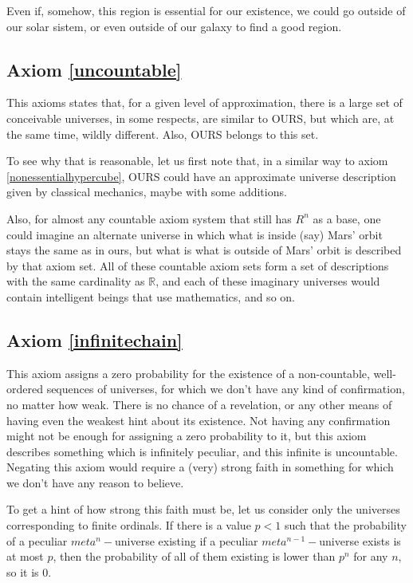 \documentclass[a4paper
,draft
]{article}
\def\reale{\mathbb{R}}
\begin{document}
Even if, somehow, this region is essential for our existence, we could go outside of our solar sistem, or even outside of our galaxy to find a good region.

\subsection{Axiom \ref{uncountable}}

This axioms states that, for a given level of approximation, there is a large set of conceivable universes, in some respects, are similar to OURS, but which are, at the same time, wildly different. Also, OURS belongs to this set.

To see why that is reasonable, let us first note that, in a similar way to axiom \ref{nonessentialhypercube}, OURS could have an approximate universe description given by classical mechanics, maybe with some additions.

Also, for almost any countable axiom system that still has $R^n$ as a base, one could imagine an alternate universe in which what is inside (say) Mars' orbit stays the same as in ours, but what is what is outside of Mars' orbit is described by that axiom set. All of these countable axiom sets form a set of descriptions with the same cardinality as $\reale$, and each of these imaginary universes would contain intelligent beings that use mathematics, and so on.

\subsection{Axiom \ref{infinitechain}}

This axiom assigns a zero probability for the existence of a non-countable, well-ordered sequences of universes, for which we don't have any kind of confirmation, no matter how weak. There is no chance of a revelation, or any other means of having even the weakest hint about its existence. Not having any confirmation might not be enough for assigning a zero probability to it, but this axiom describes something which is infinitely peculiar, and this infinite is uncountable. Negating this axiom would require a (very) strong faith in something for which we don't have any reason to believe.

To get a hint of how strong this faith must be, let us consider only the universes corresponding to finite ordinals. If there is a value $p < 1$ such that the probability of a peculiar $meta^n-$universe existing if a peculiar $meta^{n-1}-$universe exists is at most $p$, then the probability of all of them existing is lower than $p^n$ for any $n$, so it is $0$.
\end{document}
